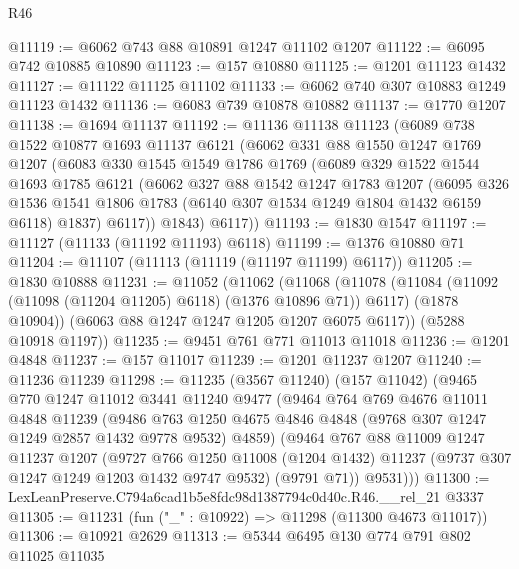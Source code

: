 \begin{lexlean}{R46}
\begin{coremodule}
@11119 := @6062 @743 @88 @10891 @1247 @11102 @1207
@11122 := @6095 @742 @10885 @10890
@11123 := @157 @10880
@11125 := @1201 @11123 @1432
@11127 := @11122 @11125 @11102
@11133 := @6062 @740 @307 @10883 @1249 @11123 @1432
@11136 := @6083 @739 @10878 @10882
@11137 := @1770 @1207
@11138 := @1694 @11137
@11192 := @11136
    @11138
    @11123
    (@6089
      @738
      @1522
      @10877
      @1693
      @11137
      @6121
      (@6062
        @331
        @88
        @1550
        @1247
        @1769
        @1207
        (@6083
          @330
          @1545
          @1549
          @1786
          @1769
          (@6089
            @329
            @1522
            @1544
            @1693
            @1785
            @6121
            (@6062
              @327
              @88
              @1542
              @1247
              @1783
              @1207
              (@6095
                @326
                @1536
                @1541
                @1806
                @1783
                (@6140 @307 @1534 @1249 @1804 @1432 @6159 @6118)
                @1837)
              @6117))
          @1843)
        @6117))
@11193 := @1830 @1547
@11197 := @11127 (@11133 (@11192 @11193) @6118)
@11199 := @1376 @10880 @71
@11204 := @11107 (@11113 (@11119 (@11197 @11199) @6117))
@11205 := @1830 @10888
@11231 := @11052
    (@11062
      (@11068
        (@11078
          (@11084 (@11092 (@11098 (@11204 @11205) @6118) (@1376 @10896 @71)) @6117)
          (@1878 @10904))
        (@6063 @88 @1247 @1247 @1205 @1207 @6075 @6117))
      (@5288 @10918 @1197))
@11235 := @9451 @761 @771 @11013 @11018
@11236 := @1201 @4848
@11237 := @157 @11017
@11239 := @1201 @11237 @1207
@11240 := @11236 @11239
@11298 := @11235
    (@3567 @11240)
    (@157 @11042)
    (@9465
      @770
      @1247
      @11012
      @3441
      @11240
      @9477
      (@9464
        @764
        @769
        @4676
        @11011
        @4848
        @11239
        (@9486 @763 @1250 @4675 @4846 @4848 (@9768 @307 @1247 @1249 @2857 @1432 @9778 @9532) @4859)
        (@9464
          @767
          @88
          @11009
          @1247
          @11237
          @1207
          (@9727
            @766
            @1250
            @11008
            (@1204 @1432)
            @11237
            (@9737 @307 @1247 @1249 @1203 @1432 @9747 @9532)
            (@9791 @71))
          @9531)))
@11300 := LexLeanPreserve.C794a6cad1b5e8fdc98d1387794c0d40c.R46.__rel_21 @3337
@11305 := @11231 (fun ("_" : @10922) => @11298 (@11300 @4673 @11017))
@11306 := @10921 @2629
@11313 := @5344 @6495 @130 @774 @791 @802 @11025 @11035

\end{coremodule}
\end{lexlean}
